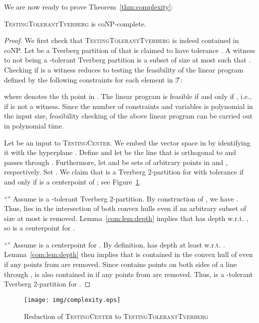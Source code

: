 \documentclass[oribibl,envcountsame,envcountsect]{llncs}
\newcommand{\mc}[1]{\ensuremath{\mathcal{#1}}}
\begin{document}
We are now ready to prove Theorem~\ref{thm:complexity}:
\begin{theorem}
  \textsc{TestingTolerantTverberg} is coNP-complete.
\end{theorem}
\begin{proof}
  We first check that \textsc{TestingTolerantTverberg} is indeed contained in
  coNP. Let  be a Tverberg partition of  that is claimed to have tolerance . A witness to
   not being a -tolerant Tverberg partition is a subset
   of size at most  such that
  . Checking if
   is a witness reduces to testing the feasibility  of the linear
  program defined by the following constraints for each element
   in \mc{T}:
  
  where  denotes the th point in .
  The linear program is feasible if and only if , i.e., if  is not a witness.
  Since the number of constraints and variables is polynomial in the input size,
  feasibility checking of the above linear program can be carried out in
  polynomial time.

  Let  be an input to
  \textsc{TestingCenter}. We embed the vector space  in 
  by identifying it with the hyperplane .  Define  and let  be the line that is orthogonal to  and
  passes through . Furthermore, let  and  be sets of 
  arbitrary points in  and , respectively.  Set . We claim that  is a Tverberg 2-partition for  with tolerance  if and only if  is a centerpoint of ; see
  Figure~\ref{com:fig:red}.

  ``'' Assume  is a -tolerant Tverberg
    2-partition. By construction of , we have .
    Thus,  lies in the intersection
    of both convex hulls even if an arbitrary subset of size at most  is removed.
    Lemma~\ref{com:lem:depth} implies that  has depth  w.r.t. , so  is a centerpoint for .

  ``'' Assume  is a centerpoint for . By
      definition,  has depth at least
       w.r.t. . Lemma~\ref{com:lem:depth}
      then implies that  is contained in the
      convex hull of  even if any  points from  are removed. Since
       contains  points on both sides of a line through ,  is also
      contained in  if any  points from  are removed.
      Thus,
       is a -tolerant Tverberg 2-partition for .
\end{proof}
\begin{figure}[htbp]
  \begin{center}
    \texttt{[image: img/complexity.eps]}
  \end{center}
  \caption{Reduction of \textsc{TestingCenter} to
    \textsc{TestingTolerantTverberg}}
  \label{com:fig:red}
\end{figure}
\end{document}
